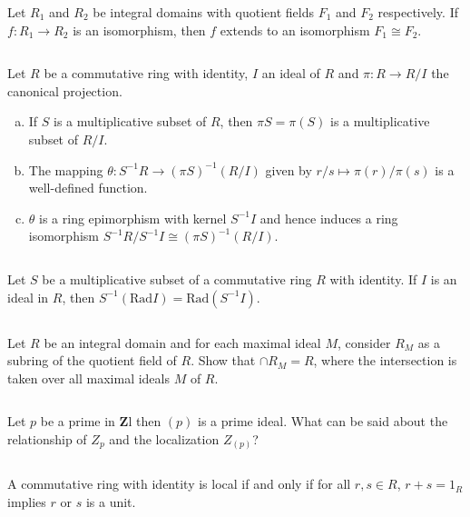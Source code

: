 $$ $$

\begin{ex}
    Let $R_{1}$ and $R_{2}$ be integral domains with quotient fields $F_{1}$ and $F_{2}$ respectively. If $f:R_{1}\to R_{2}$ is an isomorphism, then $f$ extends to an isomorphism $F_{1}\cong F_{2}$.
\end{ex}

$$ $$

\begin{ex}
    Let $R$ be a commutative ring with identity, $I$ an ideal of $R$ and $\pi:R\to R /I$ the canonical projection.
    \begin{enumerate}[(a)]
        \item If $S$ is a multiplicative subset of $R$, then $\pi S=\pi(S)$ is a multiplicative subset of $R /I$.
        \item The mapping $\theta:S^{-1}R\to (\pi S)^{-1}(R/I)$ given by $r /s\mapsto \pi(r) /\pi(s)$ is a well-defined function.
        \item $\theta$ is a ring epimorphism with kernel $S^{-1}I$ and hence induces a ring isomorphism $S^{-1}R /S^{-1}I\cong (\pi S)^{-1}(R /I)$.
    \end{enumerate}
\end{ex}

$$ $$

\begin{ex}
    Let $S$ be a multiplicative subset of a commutative ring $R$ with identity. If $I$ is an ideal in $R$, then $S^{-1}(\mathrm{Rad}I)=\mathrm{Rad}(S^{-1}I)$.
\end{ex}

$$ $$

\begin{ex}
    Let $R$ be an integral domain and for each maximal ideal $M$, consider $R_{M}$ as a subring of the quotient field of $R$. Show that $\cap R_{M}=R$, where the intersection is taken over all maximal ideals $M$ of $R$.
\end{ex}

$$ $$

\begin{ex}
    Let $p$ be a prime in $\mathbf{Z}$l then $(p)$ is a prime ideal. What can be said about the relationship of $Z_{p}$ and the localization $Z_{(p)}$?
\end{ex}

$$ $$

\begin{ex}
    A commutative ring with identity is local if and only if for all $r,s\in R$, $r+s=1_{R}$ implies $r$ or $s$ is a unit.
\end{ex}


